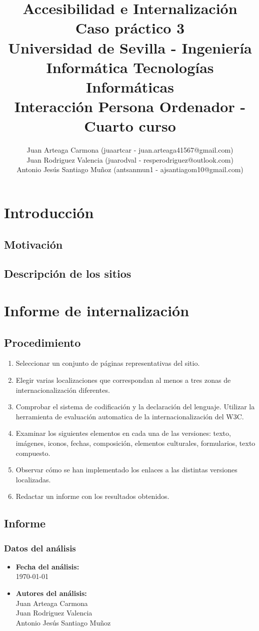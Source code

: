 \documentclass[a4paper,11pt]{article}
\title{
        \textbf{Accesibilidad e Internalización}\large\\
        \textbf{Caso práctico 3}\\
        \medskip
        Universidad de Sevilla - Ingeniería Informática Tecnologías Informáticas\\
        Interacción Persona Ordenador - Cuarto curso}
\author{Juan Arteaga Carmona (juaartcar - juan.arteaga41567@gmail.com)\\
        Juan Rodriguez Valencia (juarodval - resperodriguez@outlook.com)\\
        Antonio Jesús Santiago Muñoz (antsanmun1 - ajsantiagom10@gmail.com)\\
}
\begin{document}
\maketitle

\newpage
\tableofcontents
\listoffigures
\newpage


\section{Introducción}
\subsection{Motivación}
\subsection{Descripción de los sitios}

\section{Informe de internalización}
\subsection{Procedimiento}
\begin{enumerate}
  \item Seleccionar un conjunto de páginas representativas del sitio.
  \item Elegir varias localizaciones que correspondan al menos a tres zonas de internacionalización diferentes.
  \item Comprobar el sistema de codificación y la declaración del lenguaje. Utilizar la herramienta de evaluación automatica de la internacionalización del W3C. \cite{w3cinter}
  \item Examinar los siguientes elementos en cada una de las versiones: texto, imágenes, iconos, fechas, composición, elementos culturales, formularios, texto compuesto.
  \item Observar cómo se han implementado los enlaces a las distintas versiones localizadas.
  \item Redactar un informe con los resultados obtenidos.
\end{enumerate}


\subsection{Informe}
\subsubsection{Datos del análisis}
\begin{itemize}
  \item \textbf{Fecha del análisis:}\\
  \today
  \item \textbf{Autores del análisis:}\\
      Juan Arteaga Carmona\\
      Juan Rodriguez Valencia\\
      Antonio Jesús Santiago Muñoz
\end{itemize}
\end{document}
